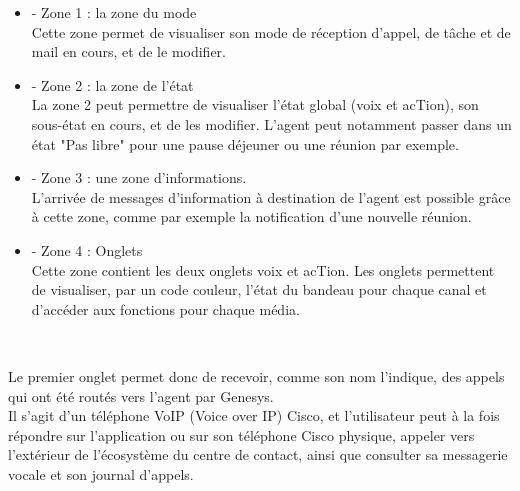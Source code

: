 \documentclass{rapport}
\begin{document}
\vspace{5mm} %
\begin{minipage}{0.25\textwidth}
\end{minipage}
\begin{minipage}{0.65\textwidth}

\begin{itemize}
\item -	Zone 1 : la zone du mode \\
Cette zone permet de visualiser son mode de réception d’appel, de tâche et de mail en cours, et de le modifier.\\

\item -	Zone 2 : la zone de l’état\\
La zone 2 peut permettre de visualiser l’état global (voix et acTion), son sous-état en cours, et de les modifier. L'agent peut notamment passer dans un état "Pas libre" pour une pause déjeuner ou une réunion par exemple.\\

\item -	Zone 3 : une zone d’informations.\\
L'arrivée de messages d'information à destination de l'agent est possible grâce à cette zone, comme par exemple la notification d'une nouvelle réunion. \\

\item -	Zone 4 : Onglets\\
Cette zone contient les deux onglets voix et acTion. 
Les onglets permettent de visualiser, par un code couleur, l’état du bandeau pour chaque canal et d’accéder aux fonctions pour chaque média.
\end{itemize}

\end{minipage}
\vspace{10mm} %
\noindent
\\

\vspace{5mm} %
\begin{minipage}{0.65\textwidth}
Le premier onglet permet donc de recevoir, comme son nom l'indique, des appels qui ont été routés vers l'agent par Genesys. \\

Il s'agit d'un téléphone VoIP (Voice over IP) Cisco, et l'utilisateur peut à la fois répondre sur l'application ou sur son téléphone Cisco physique, appeler vers l'extérieur de l'écosystème du centre de contact, ainsi que consulter sa messagerie vocale et son journal d'appels.\\

\end{minipage}
\begin{minipage}{0.25\textwidth}
\end{minipage}
\vspace{5mm} %
\noindent
\\
\end{document}
